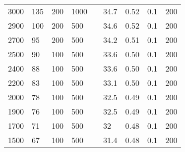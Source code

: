 \begin{longtable}[c]{|l|l|l|l|l|l|l|l|l|}
    3000          & 135                       & 200                       & 1000                      &  & 34.7       & 0.52                      & 0.1                       & 200                       \\ \cline{1-4} \cline{6-9}
    2900          & 100                       & 200                       & 500                       &  & 34.6       & 0.52                      & 0.1                       & 200                       \\ \cline{1-4} \cline{6-9}
    2700          & 95                        & 200                       & 500                       &  & 34.2       & 0.51                      & 0.1                       & 200                       \\ \cline{1-4} \cline{6-9}
    2500          & 90                        & 100                       & 500                       &  & 33.6       & 0.50                      & 0.1                       & 200                       \\ \cline{1-4} \cline{6-9}
    2400          & 88                        & 100                       & 500                       &  & 33.6       & 0.50                      & 0.1                       & 200                       \\ \cline{1-4} \cline{6-9}
    2200          & 83                        & 100                       & 500                       &  & 33.1       & 0.50                      & 0.1                       & 200                       \\ \cline{1-4} \cline{6-9}
    2000          & 78                        & 100                       & 500                       &  & 32.5       & 0.49                      & 0.1                       & 200                       \\ \cline{1-4} \cline{6-9}
    1900          & 76                        & 100                       & 500                       &  & 32.5       & 0.49                      & 0.1                       & 200                       \\ \cline{1-4} \cline{6-9}
    1700          & 71                        & 100                       & 500                       &  & 32         & 0.48                      & 0.1                       & 200                       \\ \cline{1-4} \cline{6-9}
    1500          & 67                        & 100                       & 500                       &  & 31.4       & 0.48                      & 0.1                       & 200                       \\ \cline{1-4} \cline{6-9}

\end{longtable}
